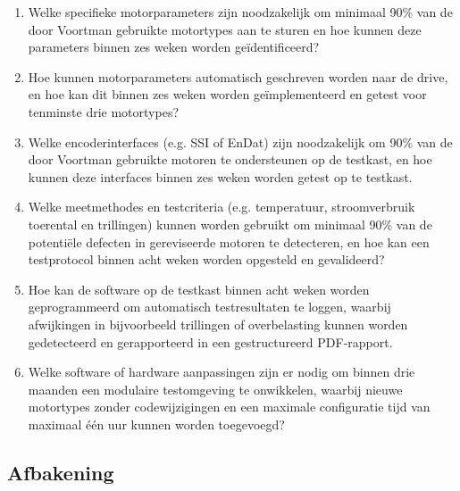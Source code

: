 \begin{enumerate}
	\item Welke specifieke motorparameters zijn noodzakelijk om minimaal 90\% van de door Voortman gebruikte motortypes aan te sturen en hoe kunnen deze parameters binnen zes weken worden geïdentificeerd?
	
	\item Hoe kunnen motorparameters automatisch geschreven worden naar de drive, en hoe kan dit binnen zes weken worden geïmplementeerd en getest voor tenminste drie motortypes?
	
	\item Welke encoderinterfaces (e.g. SSI of EnDat) zijn noodzakelijk om 90\% van de door Voortman gebruikte motoren te ondersteunen op de testkast, en hoe kunnen deze interfaces binnen zes weken worden getest op te testkast.
	
	\item Welke meetmethodes en testcriteria (e.g. temperatuur, stroomverbruik toerental en trillingen) kunnen worden gebruikt om minimaal 90\% van de potentiële defecten in gereviseerde motoren te detecteren, en hoe kan een testprotocol binnen acht weken worden opgesteld en gevalideerd?
	
	\item Hoe kan de software op de testkast binnen acht weken worden geprogrammeerd om automatisch testresultaten te loggen, waarbij afwijkingen in bijvoorbeeld trillingen of overbelasting kunnen worden gedetecteerd en gerapporteerd in een gestructureerd PDF-rapport.
	
	\item Welke software of hardware aanpassingen zijn er nodig om binnen drie maanden een modulaire testomgeving te onwikkelen, waarbij nieuwe motortypes zonder codewijzigingen en een maximale configuratie tijd van maximaal één uur kunnen worden toegevoegd?
\end{enumerate}

\newpage

\subsection{Afbakening}

